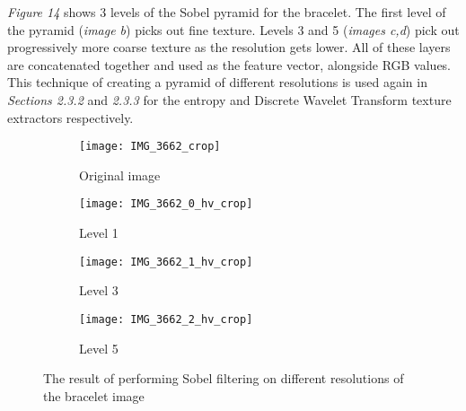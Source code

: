 \documentclass[12pt]{IIBproject}
\begin{document}
 \emph{Figure 14} shows 3 levels of the Sobel pyramid for the bracelet. The first level of the pyramid (\emph{image b}) picks out fine texture. Levels 3 and 5 (\emph{images c,d}) pick out progressively more coarse texture as the resolution gets lower. All of these layers are concatenated together and used as the feature vector, alongside RGB values. This technique of creating a pyramid of different resolutions is used again in \emph{Sections 2.3.2} and \emph{2.3.3} for the entropy and Discrete Wavelet Transform texture extractors respectively.
 \begin{figure}[H]
\centering
\begin{subfigure}{.45\textwidth}
  \centering
  \texttt{[image: IMG\_3662\_crop]}
  \caption{Original image}
  \label{fig:sub1}
\end{subfigure}%
\begin{subfigure}{.45\textwidth}
  \centering
  \texttt{[image: IMG\_3662\_0\_hv\_crop]}
  \caption{Level 1}
  \label{fig:sub2}
\end{subfigure}
\begin{subfigure}{.45\textwidth}
  \centering
  \texttt{[image: IMG\_3662\_1\_hv\_crop]}
  \caption{Level 3}
  \label{fig:sub2}
\end{subfigure}
\begin{subfigure}{.45\textwidth}
  \centering
  \texttt{[image: IMG\_3662\_2\_hv\_crop]}
  \caption{Level 5}
  \label{fig:sub2}
\end{subfigure}
\caption{The result of performing Sobel filtering on different resolutions of the bracelet image}
\label{fig:test}
\end{figure}
\end{document}
